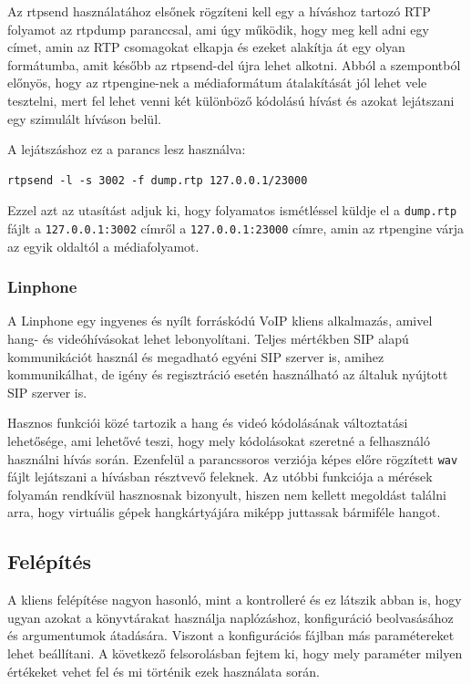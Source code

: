 Az rtpsend használatához elsőnek rögzíteni kell egy a híváshoz tartozó RTP folyamot az 
rtpdump paranccsal, ami úgy működik, hogy meg kell adni egy címet, amin az RTP csomagokat 
elkapja és ezeket alakítja át egy olyan formátumba, amit később az rtpsend-del újra
lehet alkotni. Abból a szempontból előnyös, hogy az rtpengine-nek a médiaformátum
átalakítását jól lehet vele tesztelni, mert fel lehet venni két különböző kódolású
hívást és azokat lejátszani egy szimulált híváson belül.

A lejátszáshoz ez a parancs lesz használva: 

\begin{lstlisting}[caption=RTP folyam generálásda rtpsend segítségével, label=lst:rtpsend]
rtpsend -l -s 3002 -f dump.rtp 127.0.0.1/23000
\end{lstlisting}

Ezzel azt az utasítást adjuk ki, hogy folyamatos ismétléssel küldje el a 
\texttt{dump.rtp} fájlt a \texttt{127.0.0.1:3002} címről a \texttt{127.0.0.1:23000}
címre, amin az rtpengine várja az egyik oldaltól a médiafolyamot.

\subsubsection{Linphone}

A Linphone egy ingyenes és nyílt forráskódú VoIP kliens alkalmazás, amivel hang- és 
videóhívásokat lehet lebonyolítani. Teljes mértékben SIP alapú kommunikációt használ és 
megadható egyéni SIP szerver is, amihez kommunikálhat, de igény és regisztráció esetén
használható az általuk nyújtott SIP szerver is. 

Hasznos funkciói közé tartozik a hang és videó kódolásának változtatási lehetősége, ami
lehetővé teszi, hogy mely kódolásokat szeretné a felhasználó használni hívás során.
Ezenfelül a parancssoros verziója képes előre rögzített \texttt{wav} fájlt lejátszani
a hívásban résztvevő feleknek. Az utóbbi funkciója a mérések folyamán rendkívül 
hasznosnak bizonyult, hiszen nem kellett megoldást találni arra, hogy virtuális gépek 
hangkártyájára miképp juttassak bármiféle hangot. 

\subsection{Felépítés}

A kliens felépítése nagyon hasonló, mint a kontrolleré és ez látszik abban is, hogy
ugyan azokat a könyvtárakat használja naplózáshoz, konfiguráció beolvasásához és
argumentumok átadására. Viszont a konfigurációs fájlban más paramétereket lehet 
beállítani. A következő felsorolásban fejtem ki, hogy mely paraméter milyen értékeket 
vehet fel és mi történik ezek használata során. 

